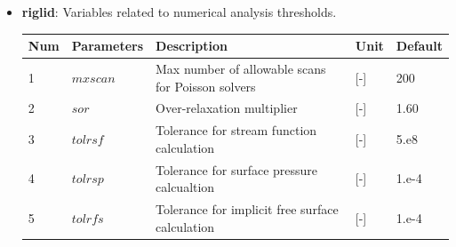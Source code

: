 \documentclass[a4paper]{article}
\begin{document}
\begin{itemize}
\item \textbf{riglid}: Variables related to numerical analysis thresholds. 
{\footnotesize
\begin{longtable}{lllll} \hline
  Num  & Parameters         & Description                                                                      & Unit                  & Default    \\ \hline 
  1    & $mxscan$           & Max number of allowable scans for Poisson solvers                                & [-]                   & 200        \\
  2    & $sor$              & Over-relaxation multiplier                                                       & [-]                   & 1.60      \\
  3    & $tolrsf$           & Tolerance for stream function calculation                                        & [-]                   & 5.e8      \\
  4    & $tolrsp$           & Tolerance for surface pressure calcualtion                                       & [-]                   & 1.e-4     \\
  5    & $tolrfs$           & Tolerance for implicit free surface calculation                                  & [-]                   & 1.e-4     \\ \hline
    \end{longtable}}
    

\end{itemize}
\end{document}
